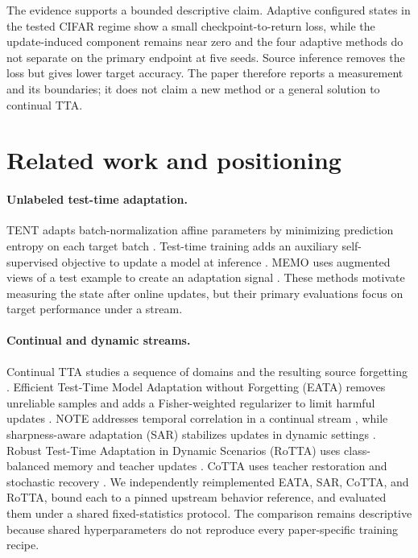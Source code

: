 \documentclass[11pt]{article}
\begin{document}
The evidence supports a bounded descriptive claim. Adaptive configured states in the tested CIFAR regime show a small checkpoint-to-return loss, while the update-induced component remains near zero and the four adaptive methods do not separate on the primary endpoint at five seeds. Source inference removes the loss but gives lower target accuracy. The paper therefore reports a measurement and its boundaries; it does not claim a new method or a general solution to continual TTA.

\section{Related work and positioning}
\label{sec:related}

\paragraph{Unlabeled test-time adaptation.}
TENT adapts batch-normalization affine parameters by minimizing prediction entropy on each target batch \citep{tent}. Test-time training adds an auxiliary self-supervised objective to update a model at inference \citep{ttt}. MEMO uses augmented views of a test example to create an adaptation signal \citep{memo}. These methods motivate measuring the state after online updates, but their primary evaluations focus on target performance under a stream.

\paragraph{Continual and dynamic streams.}
Continual TTA studies a sequence of domains and the resulting source forgetting \citep{continual}. Efficient Test-Time Model Adaptation without Forgetting (EATA) removes unreliable samples and adds a Fisher-weighted regularizer to limit harmful updates \citep{eata}. NOTE addresses temporal correlation in a continual stream \citep{note}, while sharpness-aware adaptation (SAR) stabilizes updates in dynamic settings \citep{sar}. Robust Test-Time Adaptation in Dynamic Scenarios (RoTTA) uses class-balanced memory and teacher updates \citep{rotta}. CoTTA uses teacher restoration and stochastic recovery \citep{continual}. We independently reimplemented EATA, SAR, CoTTA, and RoTTA, bound each to a pinned upstream behavior reference, and evaluated them under a shared fixed-statistics protocol. The comparison remains descriptive because shared hyperparameters do not reproduce every paper-specific training recipe.
\end{document}

